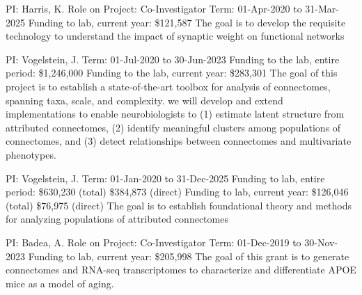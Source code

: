 \documentclass[10pt,colorlinks=true,urlcolor=blue]{moderncv}
\begin{document}
{\newline PI: Harris, K.
\newline Role on Project: Co-Investigator
\newline Term: 01-Apr-2020 to 31-Mar-2025
\newline Funding to lab, current year: \$121,587
\newline The goal is to develop the requisite technology to understand the impact of synaptic weight on functional networks}{}{}{}

{\newline PI: Vogelstein, J.
\newline Term: 01-Jul-2020 to 30-Jun-2023
\newline Funding to the lab, entire period: \$1,246,000
\newline Funding to the lab, current year: \$283,301
\newline The goal of this project is to establish a state-of-the-art toolbox for analysis of connectomes, spanning taxa, scale, and complexity. we will develop and extend implementations to enable neurobiologists to (1) estimate latent structure from attributed connectomes, (2) identify meaningful clusters among populations of connectomes, and (3) detect relationships between connectomes and multivariate phenotypes.}{}{}{}

{\newline PI: Vogelstein, J.
\newline Term: 01-Jan-2020 to 31-Dec-2025
\newline Funding to lab, entire period: \$630,230 (total) \$384,873 (direct)
\newline Funding to lab, current year: \$126,046 (total) \$76,975 (direct)
\newline The goal is to establish foundational theory and methods for analyzing populations of
attributed connectomes}{}{}{}

{\newline PI: Badea, A.
\newline Role on Project: Co-Investigator
\newline Term: 01-Dec-2019 to 30-Nov-2023
\newline Funding to lab, current year: \$205,998
\newline 
The goal of this grant is to generate connectomes and RNA-seq transcriptomes to characterize and differentiate APOE mice as a model of aging.
}{}{}{}
\end{document}
